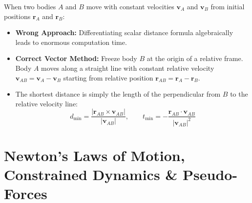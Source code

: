 \documentclass[10pt,a4paper]{article}
\begin{document}
\begin{trapbox}
When two bodies $A$ and $B$ move with constant velocities $\mathbf{v}_A$ and $\mathbf{v}_B$ from initial positions $\mathbf{r}_A$ and $\mathbf{r}_B$:
\begin{itemize}
  \item \textbf{Wrong Approach:} Differentiating scalar distance formula algebraically leads to enormous computation time.
  \item \textbf{Correct Vector Method:} Freeze body $B$ at the origin of a relative frame. Body $A$ moves along a straight line with constant relative velocity $\mathbf{v}_{AB} = \mathbf{v}_A - \mathbf{v}_B$ starting from relative position $\mathbf{r}_{AB} = \mathbf{r}_A - \mathbf{r}_B$.
  \item The shortest distance is simply the length of the perpendicular from $B$ to the relative velocity line:
  \begin{equation}
    d_{\min} = \frac{|\mathbf{r}_{AB} \times \mathbf{v}_{AB}|}{|\mathbf{v}_{AB}|}, \qquad t_{\min} = -\frac{\mathbf{r}_{AB} \cdot \mathbf{v}_{AB}}{|\mathbf{v}_{AB}|^2}
  \end{equation}
\end{itemize}
\end{trapbox}

\section{Newton's Laws of Motion, Constrained Dynamics \& Pseudo-Forces}
\end{document}
